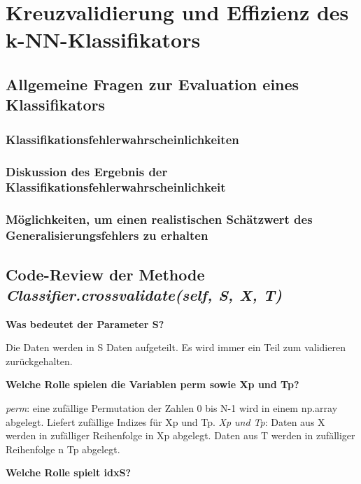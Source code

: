 \section{Kreuzvalidierung und Effizienz des k-NN-Klassifikators}

\subsection{Allgemeine Fragen zur Evaluation eines Klassifikators}

\subsubsection{Klassifikationsfehlerwahrscheinlichkeiten}

\subsubsection{Diskussion des Ergebnis der Klassifikationsfehlerwahrscheinlichkeit}

\subsubsection{Möglichkeiten, um einen realistischen Schätzwert des Generalisierungsfehlers zu erhalten}

\subsection{Code-Review der Methode \textit{Classifier.crossvalidate(self, S, X, T)}}

\noindent
\textbf{Was bedeutet der Parameter S?}

\vspace{5px}
\noindent
Die Daten werden in S Daten aufgeteilt. Es wird immer ein Teil zum validieren zurückgehalten. 

\vspace{5px}
\noindent
\textbf{Welche Rolle spielen die Variablen perm sowie Xp und Tp?}

\vspace{5px}
\noindent
\textit{perm}: eine zufällige Permutation der Zahlen 0 bis N-1 wird in einem np.array abgelegt. Liefert zufällige Indizes für Xp und Tp.
\textit{Xp und Tp}: Daten aus X werden in zufälliger Reihenfolge in Xp abgelegt. Daten aus T werden in zufälliger Reihenfolge n Tp abgelegt.

\vspace{5px}
\noindent
\textbf{Welche Rolle spielt idxS?}

